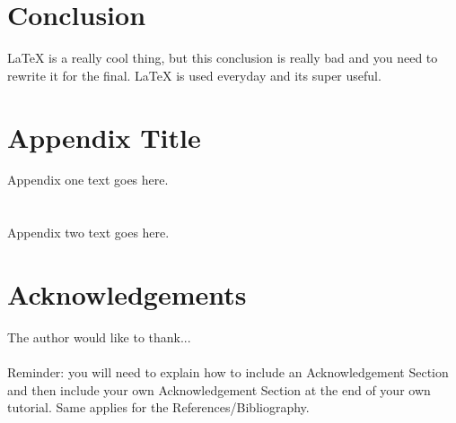 \documentclass[12pt,journal,compsoc]{IEEEtran}
\begin{document}
\section{Conclusion}
LaTeX is a really cool thing, but this conclusion is really bad and you need to rewrite it for the final. LaTeX is used everyday and its super useful.

\appendices
\section{Appendix Title}
Appendix one text goes here.

\section{}
Appendix two text goes here.


\section*{Acknowledgements}

The author would like to thank...\\ \\

Reminder: you will need to explain how to include an Acknowledgement Section and then include your own Acknowledgement Section at the end of your own tutorial. Same applies for the References/Bibliography.





\end{document}
